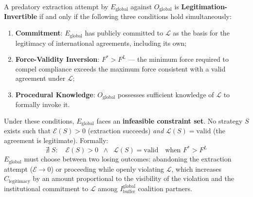 \begin{definition}
A predatory extraction attempt by $E_{\text{global}}$ against $O_{\text{global}}$ is \textbf{Legitimation-Invertible} if and only if the following three conditions hold simultaneously:
\begin{enumerate}
    \item \textbf{Commitment}: $E_{\text{global}}$ has publicly committed to $\mathcal{L}$ as the basis for the legitimacy of international agreements, including its own;
    \item \textbf{Force-Validity Inversion}: $F^* > F^L$ --- the minimum force required to compel compliance exceeds the maximum force consistent with a valid agreement under $\mathcal{L}$;
    \item \textbf{Procedural Knowledge}: $O_{\text{global}}$ possesses sufficient knowledge of $\mathcal{L}$ to formally invoke it.
\end{enumerate}
Under these conditions, $E_{\text{global}}$ faces an \textbf{infeasible constraint set}. No strategy $S$ exists such that $\mathcal{E}(S) > 0$ (extraction succeeds) \textit{and} $\mathcal{L}(S) = \text{valid}$ (the agreement is legitimate). Formally:
\begin{equation}\label{eq:13.9-infeasible-constraint-set}
\nexists\; S:\quad \mathcal{E}(S) > 0 \;\;\wedge\;\; \mathcal{L}(S) = \text{valid} \quad \text{when } F^* > F^L
\end{equation}
$E_{\text{global}}$ must choose between two losing outcomes: abandoning the extraction attempt ($\mathcal{E} \to 0$) or proceeding while openly violating $\mathcal{L}$, which increases $C_{\text{legitimacy}}$ by an amount proportional to the visibility of the violation and the institutional commitment to $\mathcal{L}$ among $I_{\text{buffer}}^{\text{global}}$ coalition partners.


\end{definition}
